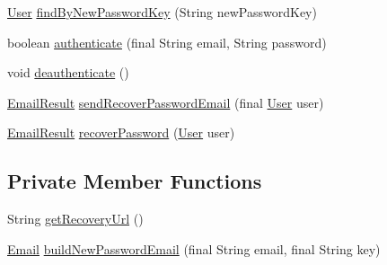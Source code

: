 \begin{DoxyCompactItemize}
\item 
\hyperlink{classbr_1_1usp_1_1cata_1_1model_1_1_user}{User} \hyperlink{classbr_1_1usp_1_1cata_1_1service_1_1_user_service_a2817d643dde843f03996a5391dc214b5}{find\+By\+New\+Password\+Key} (String new\+Password\+Key)
\item 
boolean \hyperlink{classbr_1_1usp_1_1cata_1_1service_1_1_user_service_abc8d0bc1b87c8e6d4ae0302fa064bb6d}{authenticate} (final String email, String password)
\item 
void \hyperlink{classbr_1_1usp_1_1cata_1_1service_1_1_user_service_ab4ce4dc6e4b870046935df6af6f8b24f}{deauthenticate} ()
\item 
\hyperlink{enumbr_1_1usp_1_1cata_1_1service_1_1_email_service_1_1_email_result}{Email\+Result} \hyperlink{classbr_1_1usp_1_1cata_1_1service_1_1_user_service_afdf2a96bc2ca5829ffa4ce3f9e79addb}{send\+Recover\+Password\+Email} (final \hyperlink{classbr_1_1usp_1_1cata_1_1model_1_1_user}{User} user)
\item 
\hyperlink{enumbr_1_1usp_1_1cata_1_1service_1_1_email_service_1_1_email_result}{Email\+Result} \hyperlink{classbr_1_1usp_1_1cata_1_1service_1_1_user_service_a8c83f45c33fd9fd55247ee3be46042f9}{recover\+Password} (\hyperlink{classbr_1_1usp_1_1cata_1_1model_1_1_user}{User} user)
\end{DoxyCompactItemize}
\subsection*{Private Member Functions}
\begin{DoxyCompactItemize}
\item 
String \hyperlink{classbr_1_1usp_1_1cata_1_1service_1_1_user_service_a4954ad7b1a7eb94ab67e755a408517cb}{get\+Recovery\+Url} ()
\item 
\hyperlink{classbr_1_1usp_1_1cata_1_1model_1_1_email}{Email} \hyperlink{classbr_1_1usp_1_1cata_1_1service_1_1_user_service_a75cb9e0bded697e98748f752c57e2786}{build\+New\+Password\+Email} (final String email, final String key)
\end{DoxyCompactItemize}

